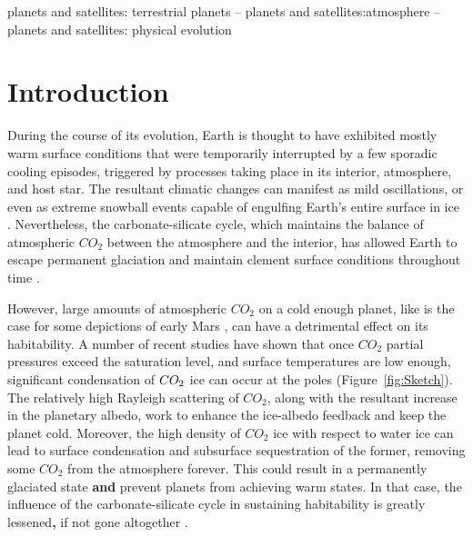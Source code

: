 \documentclass[fleqn,usenatbib]{mnras}
\providecommand{\DIFadd}[1]{{\bf #1}} %
\providecommand{\DIFdel}[1]{} %
\providecommand{\DIFaddbegin}{} %
\providecommand{\DIFaddend}{} %
\providecommand{\DIFdelbegin}{} %
\providecommand{\DIFdelend}{} %
\newcommand{\DIFscaledelfig}{0.5}
\newlength{\DIFdelgraphicswidth} %
\newlength{\DIFdelgraphicsheight} %
\newcommand{\DIFaddincludegraphics}[2][]{{\color{blue}\fbox{\DIFOincludegraphics[#1]{#2}}}} %
\newcommand{\DIFdelincludegraphics}[2][]{%
\sbox{\DIFdelgraphicsbox}{\DIFOincludegraphics[#1]{#2}}%
\settoboxwidth{\DIFdelgraphicswidth}{\DIFdelgraphicsbox} %
\settoboxtotalheight{\DIFdelgraphicsheight}{\DIFdelgraphicsbox} %
\scalebox{\DIFscaledelfig}{%
\parbox[b]{\DIFdelgraphicswidth}{\usebox{\DIFdelgraphicsbox}\\[-\baselineskip] \rule{\DIFdelgraphicswidth}{0em}}\llap{\resizebox{\DIFdelgraphicswidth}{\DIFdelgraphicsheight}{%
\setlength{\unitlength}{\DIFdelgraphicswidth}%
\begin{picture}(1,1)%
\thicklines\linethickness{2pt} %
{\color[rgb]{1,0,0}\put(0,0){\framebox(1,1){}}}%
{\color[rgb]{1,0,0}\put(0,0){\line( 1,1){1}}}%
{\color[rgb]{1,0,0}\put(0,1){\line(1,-1){1}}}%
\end{picture}%
}\hspace*{3pt}}} %
} %
\DeclareRobustCommand{\DIFaddbegin}{\DIFOaddbegin \let\includegraphics\DIFaddincludegraphics} %
\DeclareRobustCommand{\DIFaddend}{\DIFOaddend \let\includegraphics\DIFOincludegraphics} %
\DeclareRobustCommand{\DIFdelbegin}{\DIFOdelbegin \let\includegraphics\DIFdelincludegraphics} %
\DeclareRobustCommand{\DIFdelend}{\DIFOaddend \let\includegraphics\DIFOincludegraphics} %
\begin{document}
\begin{keywords}
planets and satellites: terrestrial planets -- planets and satellites:atmosphere -- planets and satellites: physical evolution
\end{keywords}



\section{Introduction}

During the course of its evolution, Earth is thought to have exhibited mostly warm surface conditions that were temporarily interrupted by a few sporadic cooling episodes, triggered by processes taking place in its interior, atmosphere, and host star. The resultant climatic changes can manifest as mild oscillations, or even as extreme snowball events capable of engulfing Earth's entire surface in ice \citep{kirschvink1992,Hoffman1342}. Nevertheless, the carbonate-silicate cycle, which maintains the balance of atmospheric $CO_{\mathrm{2}}$ between the atmosphere and the interior, has allowed Earth to escape permanent glaciation and maintain clement surface conditions throughout time \citep{Hoffman1342}.

However, large amounts of atmospheric $CO_{\mathrm{2}}$ on a cold enough planet, like is the case for some depictions of early Mars \citep{Kasting1991,wordsworth2013}, can have a detrimental effect on its habitability. A number of recent studies \citep{Kasting1991,Phumbert2005,Phumbert2011, forget2013,Soto2015, Turbet2017,kadoya_outer_2019} have shown that once $CO_{\mathrm{2}}$ partial pressures exceed the saturation level, and surface temperatures are low enough, significant condensation of $CO_{\rm 2}$ ice can occur at the poles (Figure~\ref{fig:Sketch}). The relatively high Rayleigh scattering of $CO_{\mathrm{2}}$, along with the resultant increase in the planetary albedo, work to enhance the ice-albedo feedback \citep{Kasting1991} and keep the planet cold. Moreover, the high density of $CO_{\mathrm{2}}$ ice with respect to water ice can lead to surface condensation and subsurface sequestration of the former, removing some $CO_{\mathrm{2}}$ from the atmosphere forever. This could result in a permanently glaciated state \DIFdelbegin \DIFdel{. Thus, a decrease in atmospheric $CO_{\rm 2}$  can }\DIFdelend \DIFaddbegin \DIFadd{and }\DIFaddend prevent planets from achieving warm states. In that case,  the influence of the carbonate-silicate cycle in sustaining habitability is greatly lessened\DIFaddbegin \DIFadd{, }\DIFaddend if not gone altogether \citep{Turbet2017}.  
\end{document}
